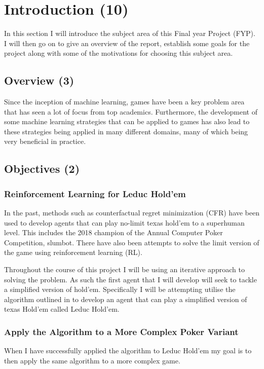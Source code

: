 \chapter{Introduction (10)}
\label{ch:intro}
In this section I will introduce the subject area of this Final year Project (FYP).
I will then go on to give an overview of the report, establish some goals for the project along with some of
the motivations for choosing this subject area.


\section{Overview (3)}\label{sec:overview}
Since the inception of machine learning, games have been a key problem area that has seen a lot of focus from
top academics.
Furthermore, the development of some machine learning strategies that can be applied to games has also lead to these
strategies being applied in many different domains, many of which being very beneficial in practice.


\section{Objectives (2)}\label{sec:objectives}
\subsection{Reinforcement Learning for Leduc Hold'em}\label{subsec:primaryObjectives}
In the past, methods such as counterfactual regret minimization (CFR) have been used to develop agents that can
play no-limit texas hold'em to a superhuman level.
This includes the 2018 champion of the Annual Computer Poker Competition, slumbot\citep{jackson2013slumbot}.
There have also been attempts to solve the limit version of the game using reinforcement learning
(RL)\citep{heinrich2016deep}.

Throughout the course of this project I will be using an iterative approach to solving the problem.
As such the first agent that I will develop will seek to tackle a simplified version of hold'em.
Specifically I will be attempting utilise the algorithm outlined in\citep{heinrich2015fictitious} to develop an agent
that can play a simplified version of texas Hold'em called Leduc Hold'em.

\subsection{Apply the Algorithm to a More Complex Poker Variant}\label{subsec:pokerPlayingAgent}
When I have successfully applied the algorithm to Leduc Hold'em my goal is to then apply the same algorithm
to a more complex game.

